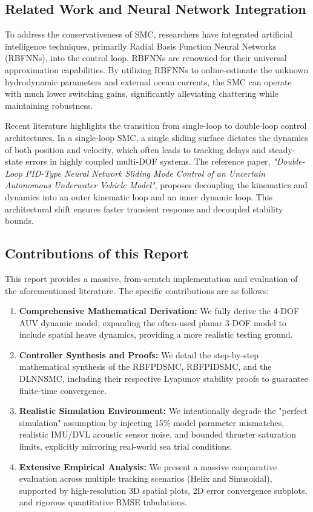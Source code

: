 \documentclass[conference]{IEEEtran}
\begin{document}
\subsection{Related Work and Neural Network Integration}
To address the conservativeness of SMC, researchers have integrated artificial intelligence techniques, primarily Radial Basis Function Neural Networks (RBFNNs), into the control loop. RBFNNs are renowned for their universal approximation capabilities. By utilizing RBFNNs to online-estimate the unknown hydrodynamic parameters and external ocean currents, the SMC can operate with much lower switching gains, significantly alleviating chattering while maintaining robustness.

Recent literature highlights the transition from single-loop to double-loop control architectures. In a single-loop SMC, a single sliding surface dictates the dynamics of both position and velocity, which often leads to tracking delays and steady-state errors in highly coupled multi-DOF systems. The reference paper, \textit{"Double-Loop PID-Type Neural Network Sliding Mode Control of an Uncertain Autonomous Underwater Vehicle Model"}, proposes decoupling the kinematics and dynamics into an outer kinematic loop and an inner dynamic loop. This architectural shift ensures faster transient response and decoupled stability bounds.

\subsection{Contributions of this Report}
This report provides a massive, from-scratch implementation and evaluation of the aforementioned literature. The specific contributions are as follows:
\begin{enumerate}
    \item \textbf{Comprehensive Mathematical Derivation:} We fully derive the 4-DOF AUV dynamic model, expanding the often-used planar 3-DOF model to include spatial heave dynamics, providing a more realistic testing ground.
    \item \textbf{Controller Synthesis and Proofs:} We detail the step-by-step mathematical synthesis of the RBFPDSMC, RBFPIDSMC, and the DLNNSMC, including their respective Lyapunov stability proofs to guarantee finite-time convergence.
    \item \textbf{Realistic Simulation Environment:} We intentionally degrade the "perfect simulation" assumption by injecting 15\% model parameter mismatches, realistic IMU/DVL acoustic sensor noise, and bounded thruster saturation limits, explicitly mirroring real-world sea trial conditions.
    \item \textbf{Extensive Empirical Analysis:} We present a massive comparative evaluation across multiple tracking scenarios (Helix and Sinusoidal), supported by high-resolution 3D spatial plots, 2D error convergence subplots, and rigorous quantitative RMSE tabulations.
\end{enumerate}
\end{document}
